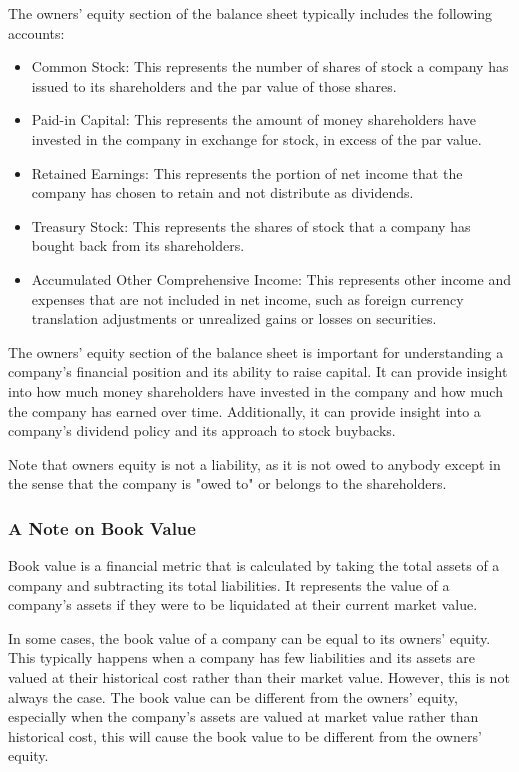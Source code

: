 \documentclass{article}
\begin{document}
The owners' equity section of the balance sheet typically includes the following accounts:

\begin{itemize}
    \item Common Stock: This represents the number of shares of stock a company has issued to its shareholders and the par value of those shares.
    \item Paid-in Capital: This represents the amount of money shareholders have invested in the company in exchange for stock, in excess of the par value.
    \item Retained Earnings: This represents the portion of net income that the company has chosen to retain and not distribute as dividends.
    \item Treasury Stock: This represents the shares of stock that a company has bought back from its shareholders.
    \item Accumulated Other Comprehensive Income: This represents other income and expenses that are not included in net income, such as foreign currency translation adjustments or unrealized gains or losses on securities.
\end{itemize}

The owners' equity section of the balance sheet is important for understanding a company's financial position and its ability to raise capital. It can provide insight into how much money shareholders have invested in the company and how much the company has earned over time. Additionally, it can provide insight into a company's dividend policy and its approach to stock buybacks.

Note that owners equity is not a liability, as it is not owed to anybody except in the sense that the company is "owed to" or belongs to the shareholders. 

\subsubsection{A Note on Book Value}
Book value is a financial metric that is calculated by taking the total assets of a company and subtracting its total liabilities. It represents the value of a company's assets if they were to be liquidated at their current market value.

In some cases, the book value of a company can be equal to its owners' equity. This typically happens when a company has few liabilities and its assets are valued at their historical cost rather than their market value. However, this is not always the case. The book value can be different from the owners' equity, especially when the company's assets are valued at market value rather than historical cost, this will cause the book value to be different from the owners' equity.
\end{document}
